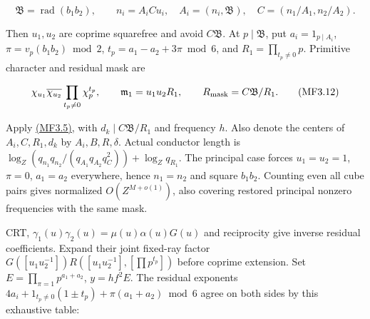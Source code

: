 \[
\mathfrak B=\operatorname{rad}(b_1b_2),\qquad
n_i=A_iCu_i,\quad A_i=(n_i,\mathfrak B),\quad
C=(n_1/A_1,n_2/A_2).
\]

Then \(u_1,u_2\) are coprime squarefree and avoid \(C\mathfrak B\). At \(p\mid\mathfrak B\), put \(a_i=1_{p\mid A_i}\), \(\pi=v_p(b_1b_2)\bmod2\), \(t_p=a_1-a_2+3\pi\bmod6\), and \(R_1=\prod_{t_p\ne0}p\). Primitive character and residual mask are

\hypertarget{mf:eq:B3.12}{}

\label{mf:eq:B3.12}

\[
\chi_{u_1}\overline{\chi_{u_2}}\prod_{t_p\ne0}\chi_p^{t_p},
\qquad\mathfrak m_1=u_1u_2R_1,
\qquad R_{\rm mask}=C\mathfrak B/R_1.
\qquad\text{(MF3.12)}
\]

Apply \protect\hyperlink{mf:eq:B3.5}{(MF3.5)}, with \(d_k\mid C\mathfrak B/R_1\) and frequency \(h\). Also denote the centers of \(A_i,C,R_1,d_k\) by \(A_i,B,R,\delta\). Actual conductor length is \(\log_Z(q_{n_1}q_{n_2}/(q_{A_1}q_{A_2}q_C^2))+\log_Zq_{R_1}\). The principal case forces \(u_1=u_2=1\), \(\pi=0\), \(a_1=a_2\) everywhere, hence \(n_1=n_2\) and square \(b_1b_2\). Counting even all cube pairs gives normalized \(O(Z^{M+o(1)})\), also covering restored principal nonzero frequencies with the same mask.

CRT, \(\gamma_1(u)\gamma_2(u)=\mu(u)\alpha(u)G(u)\) and reciprocity give inverse residual coefficients. Expand their joint fixed-ray factor \(G([u_1u_2^{-1}])R([u_1u_2^{-1}],[\prod p^{t_p}])\) before coprime extension. Set \(E=\prod_{\pi=1}p^{a_1+a_2}\), \(y=hf^2E\). The residual exponents \(4a_i+1_{t_p\ne0}(1\pm t_p)+\pi(a_1+a_2)\bmod6\) agree on both sides by this exhaustive table:

